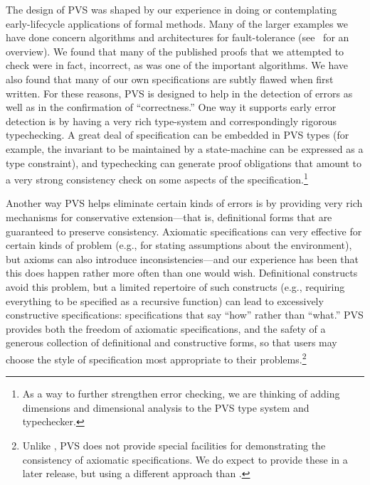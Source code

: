 The design of PVS was shaped by our experience in doing or
contemplating early-lifecycle applications of formal methods.  Many of
the larger examples we have done concern algorithms and architectures
for fault-tolerance (see~\cite{Owre95:prolegomena} for an overview).  We
found that many of the published proofs that we attempted to check
were in fact, incorrect, as was one of the important algorithms.  We
have also found that many of our own specifications are subtly flawed
when first written.  For these reasons, PVS is designed to help in the
detection of errors as well as in the confirmation of ``correctness.''
One way it supports early error detection is by having a very rich
type-system and correspondingly rigorous typechecking.  A great deal
of specification can be embedded in PVS types (for example, the
invariant to be maintained by a state-machine can be expressed as a
type constraint), and typechecking can generate proof obligations that
amount to a very strong consistency check on some aspects of the
specification.\footnote{As a way to further strengthen error checking,
we are thinking of adding dimensions and dimensional analysis to the
PVS type system and typechecker.}

Another way PVS helps eliminate certain kinds of errors is by
providing very rich mechanisms for conservative extension---that is,
definitional forms that are guaranteed to preserve consistency.
Axiomatic specifications can very effective for certain kinds of
problem (e.g., for stating assumptions about the environment), but
axioms can also introduce inconsistencies---and our experience has
been that this does happen rather more often than one would wish.
Definitional constructs avoid this problem, but a limited repertoire
of such constructs (e.g., requiring everything to be specified as a
recursive function) can lead to excessively constructive
specifications: specifications that say ``how'' rather than ``what.''
PVS provides both the freedom of axiomatic specifications, and the
safety of a generous collection of definitional and constructive
forms, so that users may choose the style of specification most
appropriate to their problems.\footnote{Unlike \ehdm, PVS does not
provide special facilities for demonstrating the consistency of
axiomatic specifications.  We do expect to provide these in a later
release, but using a different approach than \ehdm.}

